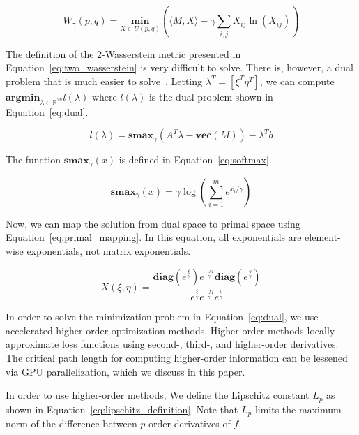 \documentclass[journal]{IEEEtran}
\begin{document}
\begin{equation}
    W_\gamma(p, q) = \underset{X \in U(p, q)}{\mathbf{min}} \left( \langle M, X \rangle - \gamma \sum_{i,j} X_{ij} \ln(X_{ij}) \right)
    \label{eq:two_wasserstein}
\end{equation}

The definition of the $2$-Wasserstein metric presented in Equation~\ref{eq:two_wasserstein} is very difficult to solve. There is, however, a dual problem that is much easier to solve~\cite{dvurechensky2023nearoptimal}. Letting $\lambda^T = [\xi^T \eta^T]$, we can compute $\mathbf{argmin}_{\lambda \in \mathbb{R}^{2n}} l(\lambda)$ where $l(\lambda)$ is the dual problem shown in Equation~\ref{eq:dual}.

\begin{equation}
    l(\lambda) = \mathbf{smax}_\gamma (A^T \lambda - \mathbf{vec}(M)) - \lambda^T b
    \label{eq:dual}
\end{equation}

The function $\mathbf{smax}_\gamma(x)$ is defined in Equation~\ref{eq:softmax}.

\begin{equation}
    \textbf{smax}_\gamma (x) = \gamma \log \left( \sum_{i=1}^m e^{x_i/\gamma} \right)
\label{eq:softmax}
\end{equation}

Now, we can map the solution from dual space to primal space using Equation~\ref{eq:primal_mapping}. In this equation, all exponentials are element-wise exponentials, not matrix exponentials.

\begin{equation}
    X(\xi, \eta) = \frac{\mathbf{diag}(e^\frac{\xi}{\gamma}) e^\frac{-M}{\gamma} \mathbf{diag}(e^\frac{\eta}{\gamma})}{e^\frac{\xi}{\gamma} e^\frac{-M}{\gamma} e^\frac{\eta}{\gamma}}
    \label{eq:primal_mapping}
\end{equation}

In order to solve the minimization problem in Equation~\ref{eq:dual}, we use accelerated higher-order optimization methods. Higher-order methods locally approximate loss functions using second-, third-, and higher-order derivatives. The critical path length for computing higher-order information can be lessened via GPU parallelization, which we discuss in this paper.

In order to use higher-order methods, We define the Lipschitz constant $L_{p}$ as shown in Equation~\ref{eq:lipschitz_definition}. Note that $L_{p}$ limits the maximum norm of the difference between $p$-order derivatives of $f$.
\end{document}

